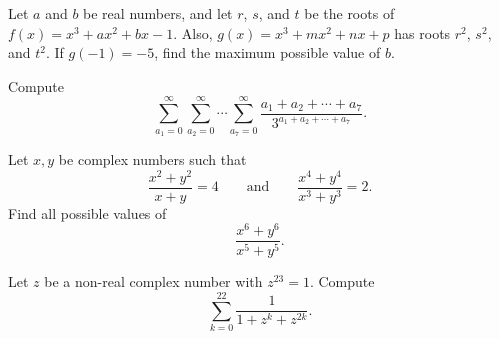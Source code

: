 %	





\begin{question}[name={2013 HMMT, Algebra, \href{https://artofproblemsolving.com/community/c129h521096p2935118}{Problem 5}}]
	Let $a$ and $b$ be real numbers, and let $r$, $s$, and $t$ be the roots of $f(x)=x^3+ax^2+bx-1$. Also, $g(x)=x^3+mx^2+nx+p$ has roots $r^2$, $s^2$, and $t^2$. If $g(-1)=-5$, find the maximum possible value of $b$.	
\end{question}




%	




\begin{question}[name={2013 HMMT, Algebra, \href{https://artofproblemsolving.com/community/c129h521098p2935121}{Problem 7}}]
	Compute\[\sum_{a_1=0}^\infty\sum_{a_2=0}^\infty\cdots\sum_{a_7=0}^\infty\dfrac{a_1+a_2+\cdots+a_7}{3^{a_1+a_2+\cdots+a_7}}.\]
\end{question}




%	




\begin{question}[name={2013 HMMT, Algebra, \href{https://artofproblemsolving.com/community/c129h521099p2935122}{Problem 8}}]
	Let $x,y$ be complex numbers such that $$\frac{x^2+y^2}{x+y}=4 \qquad \text{and} \qquad \frac{x^4+y^4}{x^3+y^3}=2.$$ Find all possible values of $$\frac{x^6+y^6}{x^5+y^5}.$$
\end{question}




%	




\begin{question}[name={2013 HMMT, Algebra, \href{https://artofproblemsolving.com/community/c129h521101p2935125}{Problem 9}}]
	Let $z$ be a non-real complex number with $z^{23}=1$. Compute\[\sum_{k=0}^{22}\dfrac{1}{1+z^k+z^{2k}}.\]
\end{question}




